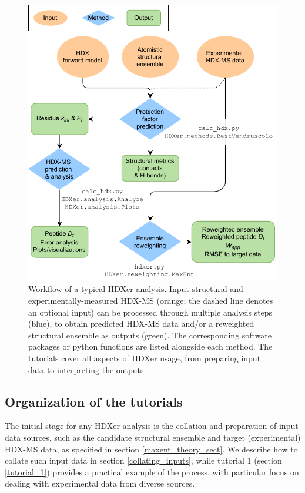 \documentclass[9pt,tutorial]{livecoms}
\begin{document}
\begin{figure}[t]
    \includegraphics[width=0.98\linewidth]{Fig2_HDXer_workflow_vertical.pdf}
    \caption{Workflow of a typical HDXer analysis. Input structural and experimentally-measured HDX-MS (orange; the dashed line denotes an optional input) can be processed through multiple analysis steps (blue), to obtain predicted HDX-MS data and/or a reweighted structural ensemble as outputs (green). The corresponding software packages or python functions are listed alongside each method. The tutorials cover all aspects of HDXer usage, from preparing input data to interpreting the outputs.}
    \label{fig:workflowfig}
\end{figure}

\subsection{Organization of the tutorials}
The initial stage for any HDXer analysis is the collation and preparation of input data sources, such as the candidate structural ensemble and target (experimental) HDX-MS data, as specified in section \ref{maxent_theory_sect}. 
We describe how to collate such input data in section \ref{collating_inputs}, while tutorial 1 (section \ref{tutorial_1}) provides a practical example of the process, with particular focus on dealing with experimental data from diverse sources.
\end{document}
